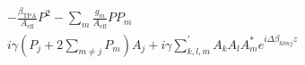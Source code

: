 \documentclass[border=14pt]{standalone}
\begin{document}
\begin{gather*}
-\frac{\beta_{\mathrm{TPA}}}{A_{\mathrm{eff}}}P^2
-\sum_m\frac{g_m}{A_{\mathrm{eff}}}P P_m
\\[1.1em]
i\gamma\left(P_j+2\sum_{m\ne j}P_m\right)A_j
+i\gamma\sum_{k,l,m}^{\prime}
A_k A_l A_m^* e^{i\Delta\beta_{klmj}z}
\end{gather*}
\end{document}
